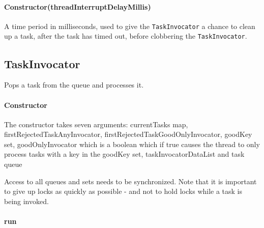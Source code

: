 \paragraph{Constructor(threadInterruptDelayMillis)} A time period in 
milliseconds, used to give the \texttt{TaskInvocator} a chance to clean up a 
task, after the task has timed out, before clobbering the 
\texttt{TaskInvocator}.

\subsection{TaskInvocator}
Pops a task from the queue and processes it.

\paragraph{Constructor}
The constructor takes seven arguments: currentTasks map, 
firstRejectedTaskAnyInvocator, firstRejectedTaskGoodOnlyInvocator, goodKey set, 
goodOnlyInvocator which is a boolean which if true causes the thread to only 
process tasks with a key in the goodKey set, taskInvocatorDataList and task 
queue

Access to all queues and sets needs to be synchronized. Note that it is 
important to give up locks as quickly as possible - and not to hold locks while 
a task is being invoked.

\pagebreak
\paragraph{run}


